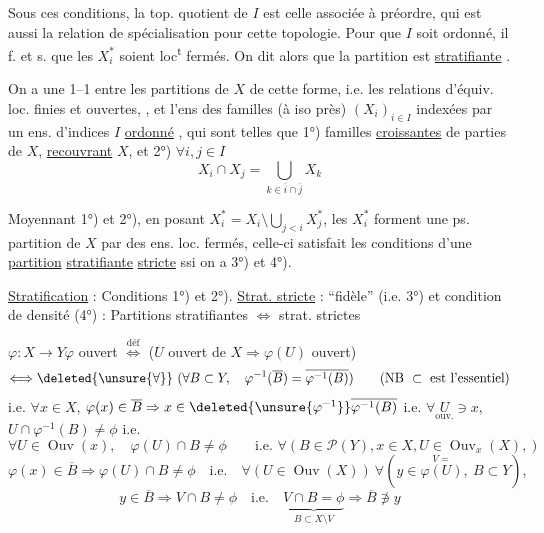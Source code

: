 Sous ces conditions, la top. quotient de $I$ est celle
associée à  préordre, qui est aussi
la relation de spécialisation pour cette topologie.
Pour que $I$ soit ordonné, il f. et s. que les
$X_i^*$ soient loc\textsuperscript{t} fermés. On dit alors que la partition est
\uline{stratifiante} .

On a une  1--1 entre les partitions
 de $X$ de cette forme, i.e. les relations d'équiv. loc.
finies et ouvertes, , et l'ens des familles (à iso près)
$(X_i)_{i\in I}$ indexées par un ens. d'indices $I$ \uline{ordonné}
,
qui sont telles que 1°) familles \uline{croissantes} de parties
  de $X$,  \uline{recouvrant} $X$, et 2°) $\forall i,j\in I$
\[
X_i\cap X_j=\bigcup_{k\in\overline i\cap\overline j}X_k
\]


Moyennant 1°) et 2°), en posant $X_i^*=X_i\setminus\bigcup_{j<i}X_j^*$,
les $X_i^*$ forment une ps. partition  de $X$ par des
ens. loc. fermés, celle-ci satisfait les conditions
d'une \uline{partition} \uline{stratifiante} \uline{stricte}  ssi
on a 3°) et 4°).

\uline{Stratification} : Conditions 1°) et 2°). \uline{Strat. stricte} : ``fidèle'' (i.e.
3°) et condition de densité (4°) : Partitions stratifiantes $\Longleftrightarrow$ strat. strictes

$\varphi:X\longrightarrow Y$\qquad $\varphi$ ouvert $\overset{\mathrm{déf}}\Longleftrightarrow$ ($U$ ouvert de $X\Rightarrow\varphi(U)$ ouvert)
\[
\Longleftrightarrow\deleted{\unsure{\forall}}\ (\forall B\subset Y,\quad\varphi^{-1}(\overline B)=\overline{\varphi^{-1}(B)})
\qquad(\text{NB }\subset\text{ est l'essentiel})
\]
i.e. $\forall x\in X$, $\varphi(x)\in\overline B\Rightarrow x\in\deleted{\unsure{\varphi^{-1}}}\overline{\varphi^{-1}(B)}$
i.e. $\forall\underset{\mathrm{ouv.}}{U}\ni x$, $U\cap\varphi^{-1}(B)\ne\phi$ i.e.
\[
\forall U\in\operatorname{Ouv}(x),\quad\varphi(U)\cap B\ne\phi
\qquad\text{i.e. }\forall(B\in\mathcal P(Y),x\in X,U\in\operatorname{Ouv}_x(X),)
\]
\[
\varphi(x)\in\overline B\Rightarrow\varphi(U)\cap B\ne\phi\quad\text{i.e.}\quad
\forall(U\in\operatorname{Ouv}(X))\ \forall(y\in\overset{V=}{\varphi(U)},\ B\subset Y),
\]
\[
y\in\overline B\Rightarrow V\cap B\ne\phi\quad\text{i.e.}\quad
\underbrace{V\cap B=\phi}_{B\subset X\setminus V}\Rightarrow\overline B\not\ni y
\]

